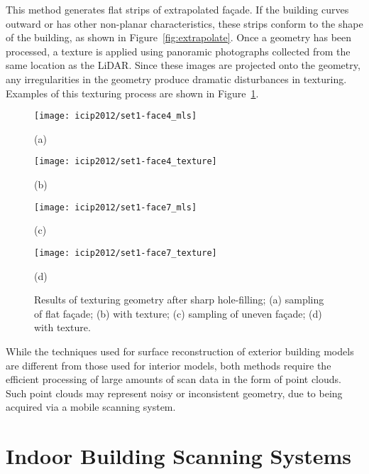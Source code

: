 \documentclass[12pt,onecolumn,oneside]{book}
\begin{document}
This method generates flat strips of extrapolated fa\c{c}ade.  If the building curves outward or has other non-planar characteristics, these strips conform to the shape of the building, as shown in Figure~\ref{fig:extrapolate}.  Once a geometry has been processed, a texture is applied using panoramic photographs collected from the same location as the LiDAR.  Since these images are projected onto the geometry, any irregularities in the geometry produce dramatic disturbances in texturing.  Examples of this texturing process are shown in Figure~\ref{fig:icip2012_texture}.

\begin{figure}[b]

\begin{minipage}[b]{.48\linewidth}
  \centering
  \centerline{\texttt{[image: icip2012/set1-face4\_mls]}}
  \centerline{(a)}\medskip
\end{minipage}
\hfill
\begin{minipage}[b]{.48\linewidth}
  \centering
  \centerline{\texttt{[image: icip2012/set1-face4\_texture]}}
  \centerline{(b)}\medskip
\end{minipage}
%
\begin{minipage}[b]{.48\linewidth}
  \centering
  \centerline{\texttt{[image: icip2012/set1-face7\_mls]}}
  \centerline{(c)}\medskip
\end{minipage}
\hfill
\begin{minipage}[b]{.48\linewidth}
  \centering
  \centerline{\texttt{[image: icip2012/set1-face7\_texture]}}
  \centerline{(d)}\medskip
\end{minipage}
\caption[Meshes of building fa\c{c}ades with texture.]{Results of texturing geometry after sharp hole-filling; (a) sampling of flat fa\c{c}ade; (b) with texture; (c) sampling of uneven fa\c{c}ade; (d) with texture.}
\label{fig:icip2012_texture}
\end{figure}

While the techniques used for surface reconstruction of exterior building models are different from those used for interior models, both methods require the efficient processing of large amounts of scan data in the form of point clouds.  Such point clouds may represent noisy or inconsistent geometry, due to being acquired via a mobile scanning system.

\FloatBarrier
\section{Indoor Building Scanning Systems}
\label{sec:indoor_scanning}
\end{document}
